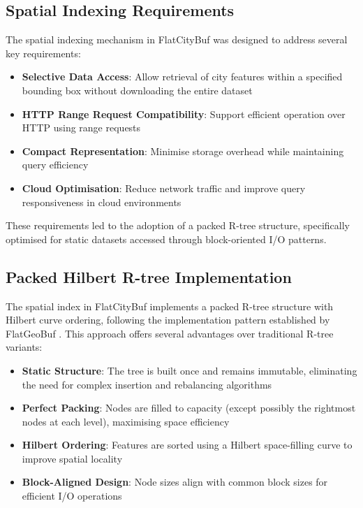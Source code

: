 \subsection{Spatial Indexing Requirements}
\label{methodology:spatial_index:requirements}

The spatial indexing mechanism in FlatCityBuf was designed to address several key requirements:

\begin{itemize}
    \item \textbf{Selective Data Access}: Allow retrieval of city features within a specified bounding box without downloading the entire dataset
    \item \textbf{HTTP Range Request Compatibility}: Support efficient operation over HTTP using range requests
    \item \textbf{Compact Representation}: Minimise storage overhead while maintaining query efficiency
    \item \textbf{Cloud Optimisation}: Reduce network traffic and improve query responsiveness in cloud environments
\end{itemize}

These requirements led to the adoption of a packed R-tree structure, specifically optimised for static datasets accessed through block-oriented I/O patterns.

\subsection{Packed Hilbert R-tree Implementation}
\label{methodology:spatial_index:packed_rtree_implementation}

The spatial index in FlatCityBuf implements a packed R-tree structure with Hilbert curve ordering, following the implementation pattern established by FlatGeoBuf \citep{horance_2022_detail}. This approach offers several advantages over traditional R-tree variants:

\begin{itemize}
    \item \textbf{Static Structure}: The tree is built once and remains immutable, eliminating the need for complex insertion and rebalancing algorithms
    \item \textbf{Perfect Packing}: Nodes are filled to capacity (except possibly the rightmost nodes at each level), maximising space efficiency
    \item \textbf{Hilbert Ordering}: Features are sorted using a Hilbert space-filling curve to improve spatial locality \citep{Kamel_Faloutsos_1993}
    \item \textbf{Block-Aligned Design}: Node sizes align with common block sizes for efficient I/O operations
\end{itemize}

